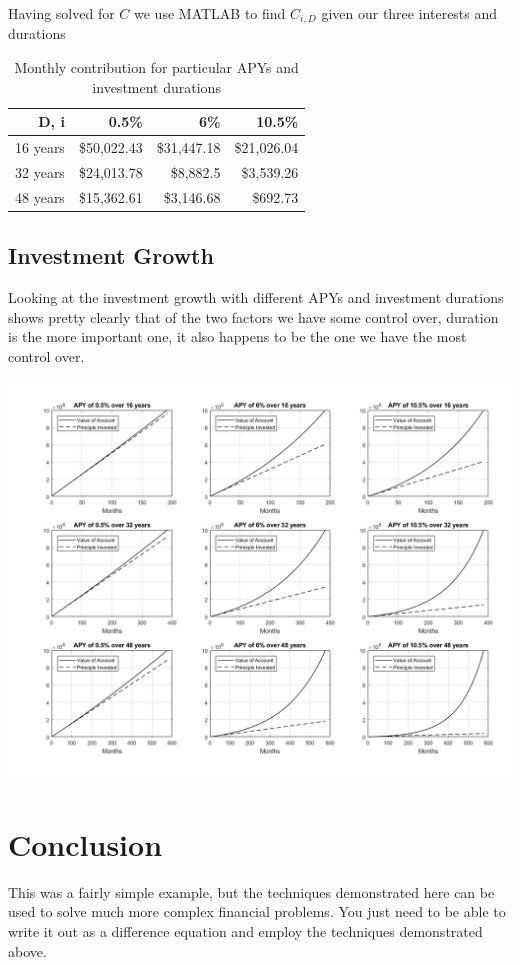 \documentclass[letterpaper]{article}
\begin{document}
Having solved for $C$ we use MATLAB to find $C_{i,D}$ given our three interests and durations
\begin{table}[h]
	\centering
	\begin{tabular}{|r|r|r|r|}
		\hline 
		D, i & 0.5\% & 6\% & 10.5\% \\ 
		\hline 
		16 years & \$50,022.43 & \$31,447.18 & \$21,026.04 \\ 
		\hline 
		32 years & \$24,013.78 & \$8,882.5 & \$3,539.26 \\ 
		\hline 
		48 years & \$15,362.61 & \$3,146.68 & \$692.73 \\ 
		\hline 
	\end{tabular} 
	\caption[Table 1:]{Monthly contribution for particular APYs and investment durations}
\end{table}

\pagebreak
\subsection{Investment Growth}
Looking at the investment growth with different APYs and investment durations shows pretty clearly that of the two factors we have some control over, duration is the more important one, it also happens to be the one we have the most control over. 
\begin{center}
	\includegraphics[width=1\linewidth]{../matlab/investment_growth.png}
\end{center}


\section{Conclusion}
This  was a fairly simple example, but the techniques demonstrated here can be used to solve much more complex financial problems. You just need to be able to write it out as a difference equation and employ the techniques demonstrated above.
\end{document}
